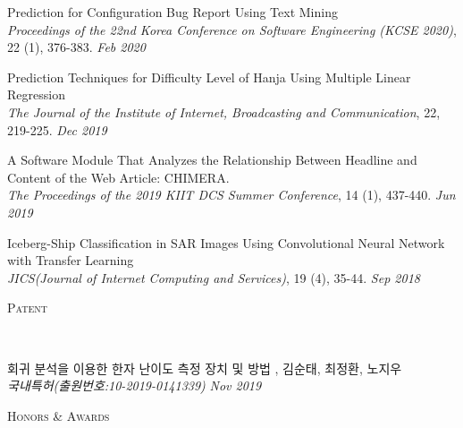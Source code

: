 \documentclass[10pt]{article}
\newenvironment{changemargin}[2]{
  \begin{list}{}{
    \setlength{\topsep}{0pt}
    \setlength{\leftmargin}{#1}
    \setlength{\rightmargin}{#2}
    \setlength{\listparindent}{\parindent}
    \setlength{\itemindent}{\parindent}
    \setlength{\parsep}{\parskip}
  }
  \item[]}{\end{list}
}
\newcommand{\lineover}{
	\begin{changemargin}{-0.05in}{-0.05in}
		\vspace*{-8pt}
		\hrulefill \\
		\vspace*{-2pt}
	\end{changemargin}
}
\newcommand{\header}[1]{
	\begin{changemargin}{-0.5in}{-0.5in}
		\scshape{#1}\\
  	\lineover
	\end{changemargin}
}
\newcommand{\presentation}[2]{
	{#1} \hfill \emph{#2}\\ \bigskip
}
\newenvironment{body} {
	\vspace*{-16pt}
	\begin{changemargin}{-0.25in}{-0.5in}
  }
	{\end{changemargin}
}
\begin{document}
\begin{body}
	\vspace{14pt}
	
\presentation{Prediction for Configuration Bug Report Using Text Mining\\ \emph{Proceedings of the 22nd Korea Conference on Software Engineering (KCSE 2020)}, 22 (1), 376-383.}{Feb 2020}

\presentation{Prediction Techniques for Difficulty Level of Hanja Using Multiple Linear Regression\\ \emph{The Journal of the Institute of Internet, Broadcasting and Communication}, 22, 219-225.}{Dec 2019}

\presentation{A Software Module That Analyzes the Relationship Between Headline and Content of the Web Article: CHIMERA.\\ \emph{The Proceedings of the 2019 KIIT DCS Summer Conference}, 14 (1), 437-440.}{Jun 2019}

\presentation{Iceberg-Ship Classification in SAR Images Using Convolutional Neural Network with Transfer Learning\\ \emph{JICS(Journal of Internet Computing and Services)}, 19 (4), 35-44.}{Sep 2018}


\end{body}

\medskip

\pagebreak


\header{Patent}

\begin{body}
	\vspace{14pt}
	
\presentation{회귀 분석을 이용한 한자 난이도 측정 장치 및 방법 , 김순태, 최정환, 노지우\\ \emph{국내특허(출원번호:10-2019-0141339)}}{Nov 2019}	
  
\end{body}

\medskip



\header{Honors \& Awards}
\end{document}
